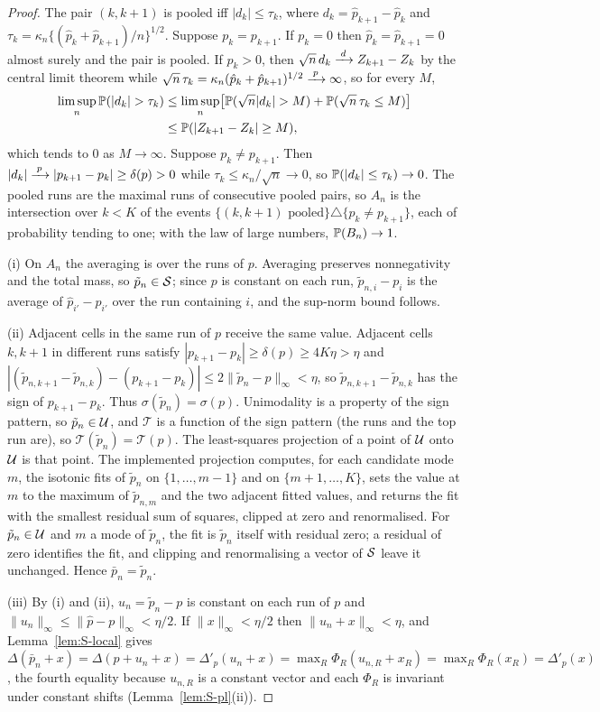 \begin{proof}
The pair $(k,k+1)$ is pooled iff $|d_k|\le\tau_k$, where $d_k=\hat p_{k+1}-\hat p_k$ and $\tau_k=\kappa_n\{(\hat p_k+\hat p_{k+1})/n\}^{1/2}$. Suppose $p_k=p_{k+1}$. If $p_k=0$ then $\hat p_k=\hat p_{k+1}=0$ almost surely and the pair is pooled. If $p_k>0$, then $\sqrt n\,d_k\xrightarrow{\;d\;} Z_{k+1}-Z_k$ by the central limit theorem while $\sqrt n\,\tau_k=\kappa_n(\hat p_k+\hat p_{k+1})^{1/2}\xrightarrow{\;p\;}\infty$, so for every $M$,
\begin{align*}
\limsup_n\Prob(|d_k|>\tau_k)&\le\limsup_n\bigl[\Prob(\sqrt n|d_k|>M)+\Prob(\sqrt n\,\tau_k\le M)\bigr]\\
&\le\Prob(|Z_{k+1}-Z_k|\ge M),
\end{align*}
which tends to $0$ as $M\to\infty$. Suppose $p_k\ne p_{k+1}$. Then $|d_k|\xrightarrow{\;p\;}|p_{k+1}-p_k|\ge\delta(p)>0$ while $\tau_k\le\kappa_n/\sqrt n\to0$, so $\mathbb{P}(|d_k|\le\tau_k)\to0$. The pooled runs are the maximal runs of consecutive pooled pairs, so $A_n$ is the intersection over $k<K$ of the events $\{(k,k+1)\text{ pooled}\}\triangle\{p_k\ne p_{k+1}\}$, each of probability tending to one; with the law of large numbers, $\mathbb{P}(B_n)\to1$.

(i) On $A_n$ the averaging is over the runs of $p$. Averaging preserves nonnegativity and the total mass, so $\tilde p_n\in\mathcal{S}$; since $p$ is constant on each run, $\tilde p_{n,i}-p_i$ is the average of $\hat p_{i'}-p_{i'}$ over the run containing $i$, and the sup-norm bound follows.

(ii) Adjacent cells in the same run of $p$ receive the same value. Adjacent cells $k,k+1$ in different runs satisfy $|p_{k+1}-p_k|\ge\delta(p)\ge4K\eta>\eta$ and $|(\tilde p_{n,k+1}-\tilde p_{n,k})-(p_{k+1}-p_k)|\le2\|\tilde p_n-p\|_\infty<\eta$, so $\tilde p_{n,k+1}-\tilde p_{n,k}$ has the sign of $p_{k+1}-p_k$. Thus $\sigma(\tilde p_n)=\sigma(p)$. Unimodality is a property of the sign pattern, so $\tilde p_n\in\mathcal{U}$, and $\mathcal T$ is a function of the sign pattern (the runs and the top run are), so $\mathcal T(\tilde p_n)=\mathcal T(p)$. The least-squares projection of a point of $\mathcal{U}$ onto $\mathcal{U}$ is that point. The implemented projection computes, for each candidate mode $m$, the isotonic fits of $\tilde p_n$ on $\{1,\dots,m-1\}$ and on $\{m+1,\dots,K\}$, sets the value at $m$ to the maximum of $\tilde p_{n,m}$ and the two adjacent fitted values, and returns the fit with the smallest residual sum of squares, clipped at zero and renormalised. For $\tilde p_n\in\mathcal{U}$ and $m$ a mode of $\tilde p_n$, the fit is $\tilde p_n$ itself with residual zero; a residual of zero identifies the fit, and clipping and renormalising a vector of $\mathcal{S}$ leave it unchanged. Hence $\bar p_n=\tilde p_n$.

(iii) By (i) and (ii), $u_n=\tilde p_n-p$ is constant on each run of $p$ and $\|u_n\|_\infty\le\|\hat p-p\|_\infty<\eta/2$. If $\|x\|_\infty<\eta/2$ then $\|u_n+x\|_\infty<\eta$, and Lemma~\ref{lem:S-local} gives $\Delta(\bar p_n+x)=\Delta(p+u_n+x)=\Delta'_p(u_n+x)=\max_R\Phi_R(u_{n,R}+x_R)=\max_R\Phi_R(x_R)=\Delta'_p(x)$, the fourth equality because $u_{n,R}$ is a constant vector and each $\Phi_R$ is invariant under constant shifts (Lemma~\ref{lem:S-pl}(ii)).
\end{proof}

